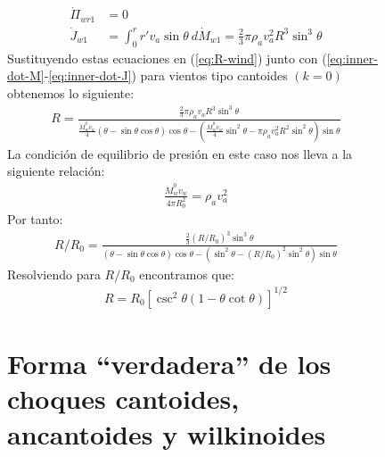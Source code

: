 \begin{figure}
\begin{align}
  \dot{\Pi}_{wr1} &= 0 \\
  \dot{J}_{w1} &= \int^r_0 r'v_a \sin\theta~d\dot{M}_{w1} = \frac{2}{3}\pi\rho_a v_a^2 R^3 \sin^3\theta \label{eq:w-jw1} 
\end{align}
Sustituyendo estas ecuaciones en (\ref{eq:R-wind}) junto con (\ref{eq:inner-dot-M}-\ref{eq:inner-dot-J}) para vientos tipo cantoides $(k=0)$ obtenemos lo siguiente:
\small
\begin{align}
  R = \frac{\frac{2}{3}\pi\rho_a v_a R^3 \sin^3\theta}{\frac{\dot{M}^0_w v_w}{4}\left(\theta-\sin\theta\cos\theta\right)\cos\theta
  - \left(\frac{\dot{M}^0_w v_w}{4}\sin^2\theta - \pi\rho_a v^2_a R^2 \sin^2\theta\right)\sin\theta}
\end{align}
\normalsize
La condición de equilibrio de presión en este caso nos lleva a la siguiente relación:
\begin{align}
  \frac{\dot{M}^0_w v_w}{4\pi R^2_0} = \rho_a v^2_a \label{eq:Wilkin-stagnation}
\end{align}
Por tanto:
\begin{align}
  R/R_0 = \frac{\frac{2}{3}\left(R/R_0\right)^3 \sin^3\theta}{\left(\theta-\sin\theta\cos\theta\right)\cos\theta
  - \left(\sin^2\theta - \left(R/R_0\right)^2 \sin^2\theta\right)\sin\theta}
\end{align}
Resolviendo para $R/R_0$ encontramos que:
\begin{align}
  R = R_0\left[\csc^2\theta\left(1 - \theta\cot\theta\right)\right]^{1/2} \label{eq:R-Wilkin}
\end{align}


\section[Forma Verdadera]{Forma ``verdadera'' de los choques cantoides, ancantoides y wilkinoides}


\end{figure}
